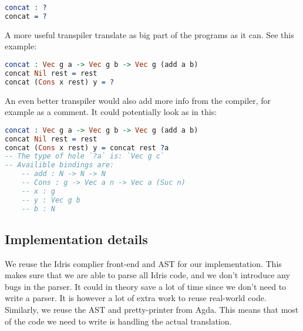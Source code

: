 \begin{lstlisting}[language=Idris,label={lst:hole2},caption={}]
concat : ?
concat = ?
\end{lstlisting}

A more useful transpiler translate as big part of the programs as it can. See
this example: %

\begin{lstlisting}[language=Idris,label={lst:hole3},caption={}]
concat : Vec g a -> Vec g b -> Vec g (add a b)
concat Nil rest = rest
concat (Cons x rest) y = ?
\end{lstlisting}

An even better transpiler would also add more info from the compiler, for
example as a comment. It could potentially look as in this:

\begin{lstlisting}[language=Idris,label={lst:hole4},caption={}]
concat : Vec g a -> Vec g b -> Vec g (add a b)
concat Nil rest = rest
concat (Cons x rest) y = concat rest ?a
-- The type of hole `?a` is: `Vec g c`
-- Availible bindings are:
    -- add : N -> N -> N
    -- Cons : g -> Vec a n -> Vec a (Suc n)
    -- x : g
    -- y : Vec g b
    -- b : N
\end{lstlisting}


\subsection{Implementation details}

We reuse the Idris complier front-end and AST for our implementation. This
makes sure that we are able to parse all Idris code, and we don't introduce any
bugs in the parser. It could in theory save a lot of time since we don't need
to write a parser. It is however a lot of extra work to reuse real-world code.
Similarly, we reuse the AST and pretty-printer from Agda. This means that most
of the code we need to write is handling the actual translation.

%

